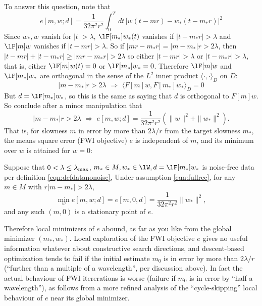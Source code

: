 To answer this question, note that 
\[
 e[m,w;d] =  \frac{1}{32\pi^2
    r^2}\int_0^T\,dt\,\left|w\left(t-mr\right)-w_*\left(t-m_*r\right)\right|^2
\]
Since $w_*, w$ vanish for $|t|>\lambda$,
$\lF[m_*]w_*(t)$ vanishes if $|t-m_*r|>\lambda$ and $\lF[m]w$ vanishes if $|t-mr|>\lambda$. So if $|mr-m_*r|
= |m-m_*|r > 2\lambda$, then $|t-mr|+|t-m_*r| \ge |mr-m_*r| >
2\lambda$ so either $|t-mr|>\lambda$ or $|t-m_*r|>\lambda$, that is,
either $\lF[m]w(t)=0$ or $\lF[m_*]w_*=0$. Therefore $\lF[m]w$ and
$\lF[m_*]w_*$ are orthogonal in the sense of the $L^2$ inner product
$\langle \cdot,\cdot \rangle_D$ on $D$:
\begin{equation}
  \label{eqn:ortho}
  |m- m_*|r > 2\lambda \,\, \Rightarrow \,\, \langle F[m]w,
  F[m_*]w_*\rangle_D = 0
\end{equation}
But $d = \lF[m_*]w_*$, so this is the same as saying that $d$ is
orthogonal to $F[m]w$. So conclude after a minor manipulation that
\begin{equation}
  \label{eqn:iso}
  |m- m_*|r > 2\lambda \,\, \Rightarrow \,\, e[m,w;d]=\frac{1}{32\pi^2
    r^2}(\|w\|^2 + \|w_*\|^2).
\end{equation}
That is, for slowness $m$ in error by more than $2\lambda/r$ from the 
target slowness $m_*$, the means square error (FWI objective) $e$ is independent of
$m$, and its minimum over $w$ is attained for $w=0$:
\begin{theorem}
  \label{thm:fwi}
  Suppose that $0 <\lambda\le \lambda_{\rm max}$,  $m_* \in M, w_*
  \in \lW, d=\lF[m_*]w_*$ is noise-free data per definition \ref{eqn:defdatanonoise},
  Under assumption \ref{eqn:fullrec}, for any $m \in M$ with $r|m-m_*|>2\lambda$,
\begin{equation}
  \label{eqn:isovpm}
 \min_w e[m,w;d]=e[m,0,d]=\frac{1}{32\pi^2 r^2}\|w_*\|^2,
\end{equation}
and any such $(m,0)$ is a stationary point of $e$.
\end{theorem}

Therefore local minimizers of $e$ abound, as far as you like from the
global minimizer $(m_*,w_*)$. Local exploration of the FWI objective
$e$ gives no useful information whatever about constructive search
directions, and descent-based optimization tends to fail if the
initial estimate $m_0$ is in error by more than $2\lambda/r$
(``further than a multiple of a wavelength'', per discussion
above). In fact the actual behaviour of FWI itererations is worse
(failure if $m_0$ is in error by ``half a wavelength''), as follows
from a more refined analysis of the ``cycle-skipping'' local behaviour of $e$ near its
global minimizer.

